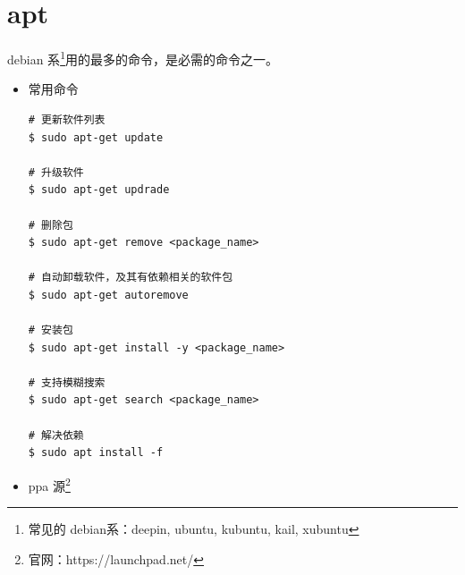 \section{apt}
debian 系\footnote{常见的 debian系：deepin, ubuntu, kubuntu, kail, xubuntu}用的最多的命令，是必需的命令之一。
\begin{itemize}
\item 常用命令
\begin{lstlisting}
# 更新软件列表
$ sudo apt-get update 

# 升级软件
$ sudo apt-get updrade 

# 删除包
$ sudo apt-get remove <package_name>

# 自动卸载软件，及其有依赖相关的软件包
$ sudo apt-get autoremove 

# 安装包
$ sudo apt-get install -y <package_name>

# 支持模糊搜索  
$ sudo apt-get search <package_name> 

# 解决依赖
$ sudo apt install -f
\end{lstlisting}

\item ppa 源\footnote{官网：https://launchpad.net/}
	
\end{itemize}
